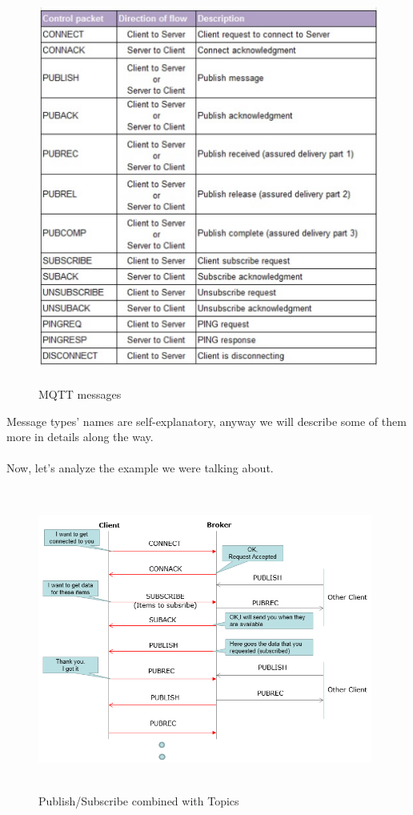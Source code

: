 \documentclass[12pt]{report}
\begin{document}
\begin{figure}[H]
\includegraphics[width=12cm,height=13cm,keepaspectratio]{mqtt_messages}
\centering
\caption{MQTT messages}
\end{figure}

Message types' names are self-explanatory, anyway we will describe some of them more in details along the way.\\\\
Now, let's analyze the example we were talking about.

\begin{figure}[H]
\includegraphics[width=11cm,height=10cm,keepaspectratio]{pubsub_schema}
\centering
\caption{Publish/Subscribe combined with Topics}
\end{figure}
\end{document}
